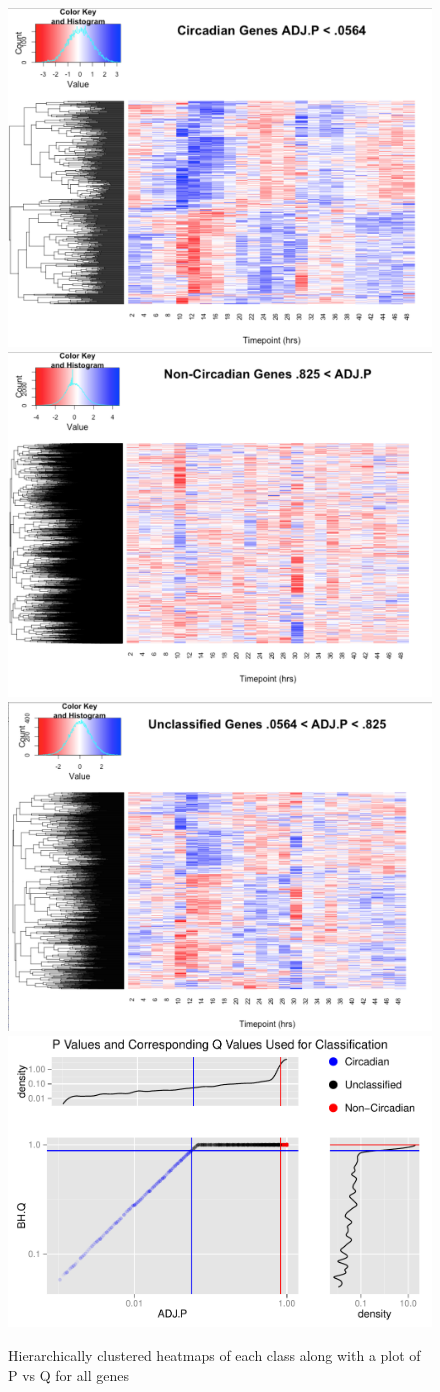 \documentclass[prl,amsmath,amssymb,floatfix,superscriptaddress,notitlepage,twocolumn]{revtex4}
\begin{document}
\begin{figure}[!ht]
  \centering
  \includegraphics[width=.4\textwidth]{Circadian.png}\quad
  \includegraphics[width=.4\textwidth]{Non-Circadian.png}\\
  \includegraphics[width=.4\textwidth]{Unclassified.png}\quad
  \includegraphics[width=.4\textwidth]{PvsQ.pdf}
  \caption{Hierarchically clustered heatmaps of each class along with a plot of P vs Q for all genes}
  \label{fig:1}
\end{figure}
\end{document}
